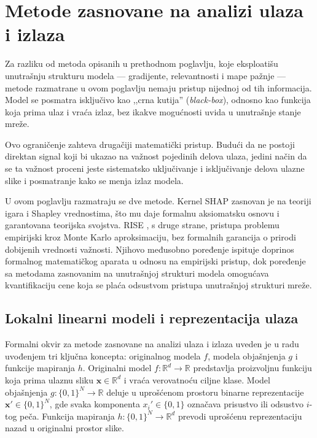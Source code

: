 \section{Metode zasnovane na analizi ulaza i izlaza}

Za razliku od metoda opisanih u prethodnom poglavlju, koje eksploatišu unutrašnju strukturu modela --- gradijente, relevantnosti i mape pažnje --- metode razmatrane u ovom poglavlju nemaju pristup nijednoj od tih informacija. Model se posmatra isključivo kao ,,crna kutija'' (\textit{black-box}), odnosno kao funkcija koja prima ulaz i vraća izlaz, bez ikakve mogućnosti uvida u unutrašnje stanje mreže.

Ovo ograničenje zahteva drugačiji matematički pristup. Budući da ne postoji direktan signal koji bi ukazao na važnost pojedinih delova ulaza, jedini način da se ta važnost proceni jeste sistematsko uključivanje i isključivanje delova ulazne slike i posmatranje kako se menja izlaz modela.

U ovom poglavlju razmatraju se dve metode. Kernel SHAP \cite{lundberg2017shap} zasnovan je na teoriji igara i Shapley vrednostima, što mu daje formalnu aksiomatsku osnovu i garantovana teorijska svojstva. RISE \cite{petsiuk2018rise}, s druge strane, pristupa problemu empirijski kroz Monte Karlo aproksimaciju, bez formalnih garancija o prirodi dobijenih vrednosti važnosti. Njihovo međusobno poređenje ispituje doprinos formalnog matematičkog aparata u odnosu na empirijski pristup, dok poređenje sa metodama zasnovanim na unutrašnjoj strukturi modela omogućava kvantifikaciju cene koja se plaća odsustvom pristupa unutrašnjoj strukturi mreže.

\subsection{Lokalni linearni modeli i reprezentacija ulaza}

Formalni okvir za metode zasnovane na analizi ulaza i izlaza uveden je u radu \cite{ribeiro2016lime} uvođenjem tri ključna koncepta: originalnog modela 
$f$, modela objašnjenja $g$ i funkcije mapiranja $h$. Originalni model 
$f: \mathbb{R}^d \to \mathbb{R}$ predstavlja proizvoljnu funkciju koja prima 
ulaznu sliku $\mathbf{x} \in \mathbb{R}^d$ i vraća verovatnoću ciljne klase. 
Model objašnjenja $g: \{0,1\}^N \to \mathbb{R}$ deluje u uprošćenom prostoru 
binarne reprezentacije $\mathbf{x}' \in \{0,1\}^N$, gde svaka komponenta 
$x_i' \in \{0,1\}$ označava prisustvo ili odsustvo $i$-tog peča. Funkcija 
mapiranja $h: \{0,1\}^N \to \mathbb{R}^d$ prevodi uprošćenu reprezentaciju 
nazad u originalni prostor slike.


